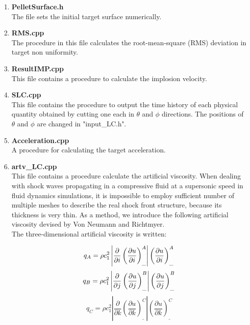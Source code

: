 \begin{enumerate}
\item {\bf PelletSurface.h}\\
The file sets the initial target surface numerically.
\item {\bf RMS.cpp}\\
The procedure in this file calculates the root-mean-square (RMS) deviation in target non uniformity.
\item {\bf ResultIMP.cpp}\\
This file contains a procedure to calculate the implosion velocity.
\item {\bf SLC.cpp}\\
This file contains the procedure to output the time history of each physical quantity obtained by cutting one each in $\theta$ and $\phi$ directions. The positions of $\theta$ and $\phi$ are changed in "input\_LC.h". 

\item {\bf Acceleration.cpp}\\
A procedure for calculating the target acceleration. 

\item {\bf artv\_LC.cpp}\\
This file contains a procedure calculate the artificial viscosity. When dealing with shock waves propagating in a compressive fluid at a supersonic speed in fluid dynamics simulations, it is impossible to employ sufficient number of multiple meshes to describe the real shock front structure, because its thickness is very thin. As a method, we introduce the following artificial viscosity devised by Von Neumann and Richtmyer\cite{artv}.\\

     The three-dimensional artificial viscosity is written:
 
\begin{equation}
		q_A=\rho c^2_1\left|\displaystyle\frac{\partial }{\partial i}\left(\frac{\partial u}{\partial i}\right)^A_{\_}\right|\left(\frac{\partial u}{\partial i}\right)^A_{\_}\\
		\label{artv_LC1}
\end{equation}
\begin{equation}
		q_B=\rho c^2_1\left|\displaystyle\frac{\partial }{\partial j}\left(\frac{\partial u}{\partial j}\right)^B_{\_}\right|\left(\frac{\partial u}{\partial j}\right)^B_{\_}\\
		\label{artv_LC2}
\end{equation}
\begin{equation}
		q_C=\rho c^2_1\left|\displaystyle\frac{\partial }{\partial k}\left(\frac{\partial u}{\partial k}\right)^C_{\_}\right|\left(\frac{\partial u}{\partial k}\right)^C_{\_}
		\label{artv_LC3}
	\end{equation}
	

\end{enumerate}

